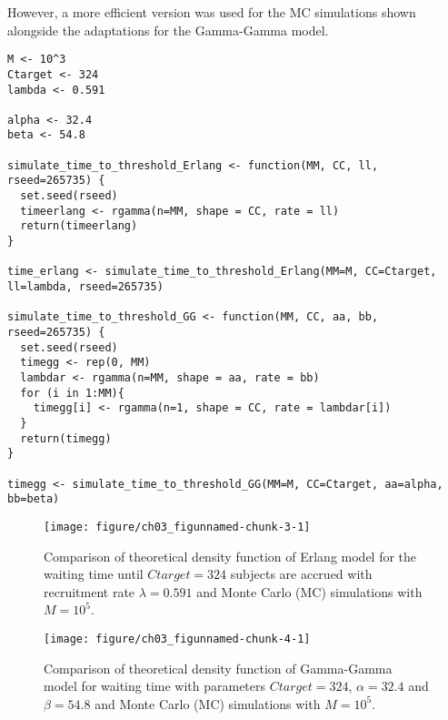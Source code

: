 However, a more efficient version was used for the MC simulations shown alongside the adaptations for the Gamma-Gamma model.

\begin{knitrout}
\color{fgcolor}\begin{kframe}
\begin{verbatim}
M <- 10^3
Ctarget <- 324
lambda <- 0.591

alpha <- 32.4
beta <- 54.8

simulate_time_to_threshold_Erlang <- function(MM, CC, ll, rseed=265735) {
  set.seed(rseed)
  timeerlang <- rgamma(n=MM, shape = CC, rate = ll)
  return(timeerlang)
}

time_erlang <- simulate_time_to_threshold_Erlang(MM=M, CC=Ctarget, ll=lambda, rseed=265735)

simulate_time_to_threshold_GG <- function(MM, CC, aa, bb, rseed=265735) {
  set.seed(rseed)
  timegg <- rep(0, MM)
  lambdar <- rgamma(n=MM, shape = aa, rate = bb)
  for (i in 1:MM){
    timegg[i] <- rgamma(n=1, shape = CC, rate = lambdar[i])
  }
  return(timegg)
}

timegg <- simulate_time_to_threshold_GG(MM=M, CC=Ctarget, aa=alpha, bb=beta) 
\end{verbatim}
\end{kframe}
\end{knitrout}

\begin{figure}
\begin{knitrout}
\color{fgcolor}
\texttt{[image: figure/ch03\_figunnamed-chunk-3-1]} 
\end{knitrout}
\caption{Comparison of theoretical density function of Erlang model for the waiting time until $Ctarget = 324$ subjects are accrued with recruitment rate $\lambda = 0.591$ and Monte Carlo (MC) simulations with $M=10^5$.}
\label{fig:3_3}
\end{figure}


\begin{figure}
\begin{knitrout}
\color{fgcolor}
\texttt{[image: figure/ch03\_figunnamed-chunk-4-1]} 
\end{knitrout}
\caption{Comparison of theoretical density function of Gamma-Gamma model for waiting time with parameters $Ctarget = 324$, $\alpha = 32.4$ and $\beta = 54.8$ and Monte Carlo (MC) simulations with $M=10^5$.}
\label{fig:3_4}
\end{figure}






